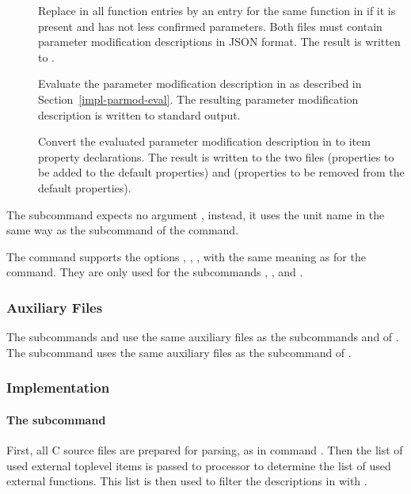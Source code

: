 \begin{description}
\item[] Replace in  all function entries by an entry for the same function in 
if it is present and has not less confirmed parameters. Both files must contain 
parameter modification descriptions in JSON format. The result is written to .

\item[] Evaluate the parameter modification description in  as described in 
Section~\ref{impl-parmod-eval}.  The resulting parameter modification description is written to standard output.

\item[] Convert the evaluated parameter modification description in  to item property declarations.
The result is written to the two files  (properties to be added to the default properties) 
and  (properties to be removed from the default properties).

\end{description}

The subcommand  expects no argument , instead, it uses the unit name in the same way as the subcommand  
of the  command.

The  command supports the options , , ,  with the same meaning as
for the  command. They are only used for the subcommands , , and .

\subsubsection{Auxiliary Files}

The subcommands  and  use the same auxiliary files as the subcommands  and  of .
The subcommand  uses the same auxiliary files as the subcommand  of .

\subsubsection{Implementation}

\paragraph{The subcommand } 
First, all C source files are prepared for parsing, as in command . Then the list of used external toplevel 
items  is passed to processor  to determine the list of 
used external functions. This list is then used to filter the descriptions in  with .

